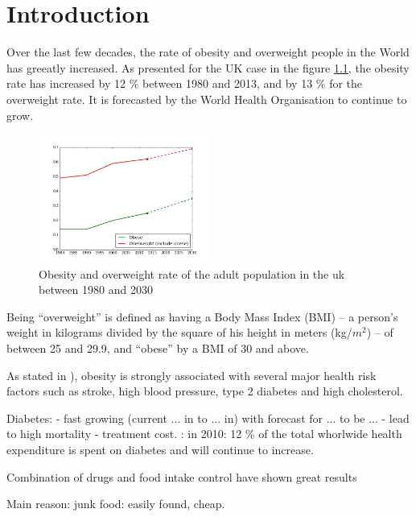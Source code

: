 \chapter{Introduction}

Over the last few decades, the rate of obesity and overweight people in the World has greeatly increased. As presented for the UK case in the figure \ref{fig:obesity_uk}, the obesity rate has increased by 12 \% between 1980 and 2013, and by 13 \% for the overweight rate. It is forecasted by the World Health Organisation to continue to grow.

\begin{figure}[h]
    \centering
    \includegraphics[width=0.5\textwidth,  height=0.455\textwidth ]{img/obesity_uk.jpg}
    \caption[Obesity and overweight rate of the adult population in the uk between 1980 and 2030. \textit{Source: World Health Organisation}]{Obesity and overweight rate of the adult population in the uk between 1980 and 2030}
    \label{fig:obesity_uk}
\end{figure}

Being “overweight” is defined as having a Body Mass Index (BMI) – a person's weight in kilograms divided by the square of his height in meters (kg/$m^2$) – of between 25 and 29.9, and “obese” by a BMI of 30 and above.

As stated in \cite{Mokdad2003}), obesity is strongly associated with several major health risk factors such as stroke, high blood pressure, type 2 diabetes and high cholesterol.

Diabetes:
- fast growing (current ... in to ... in) with forecast for ... to be ...
- lead to high mortality
- treatment cost. \cite{Zhang2010}: in 2010: 12 \% of the total whorlwide health expenditure is spent on diabetes and will continue to increase.

Combination of drugs and food intake control have shown great results

Main reason: junk food: easily found, cheap.

